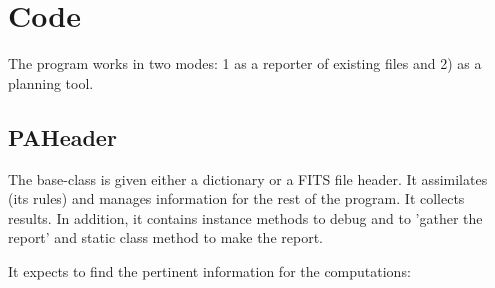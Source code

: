 \documentclass[letter,11pt,oneside]{article}
\newcommand{\dhl}[1]{{\color{verbcolor}{\texttt#1}}}
\begin{document}

\appendix
\renewcommand \thesection{\Alph{section}}

\section{Code}

The program {\color{verbcolor}{\verb#p_angle#}} works in
two modes: 1 as a reporter of existing files and 2) 
as a planning tool. 

\subsection{PAHeader}

The base-class \dhl{PAHeader} is given either a dictionary or a FITS
file header. It assimilates (its rules) and manages information for
the rest of the program. It collects results. In addition, it contains
instance methods to debug and to 'gather the report' and static
class method to make the report.

It expects to find the pertinent information for the
computations:
\end{document}
